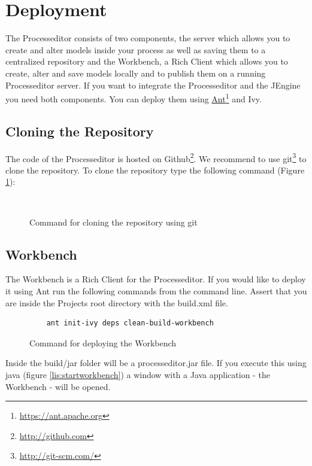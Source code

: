 \section{Deployment}

The Processeditor consists of two components, the server which allows you to create and alter models inside your process as well as saving them to a centralized repository and the Workbench, a Rich Client which allows you to create, alter and save models locally and to publish them on a running Processeditor server.
If you want to integrate the Processeditor and the JEngine you need both components.
You can deploy them using \href{https://ant.apache.org}{Ant}\footnote{\url{https://ant.apache.org}} and Ivy.

\subsection{Cloning the Repository}

The code of the Processeditor is hosted on Github\footnote{\url{http://github.com}}.
We recommend to use git\footnote{\url{http://git-scm.com/}} to clone the repository.
To clone the repository type the following command (Figure \ref{lis:clone}):

\begin{figure}[h!]
\begin{verbatim}
	
\end{verbatim}
\caption{Command for cloning the repository using git}
\label{lis:clone}
\end{figure}

\subsection{Workbench}

The Workbench is a Rich Client for the Processeditor.
If you would like to deploy it using Ant run the following commands from the command line. Assert that you are inside the Projects root directory with the build.xml file.

\begin{figure}[h!]
\begin{verbatim}
	ant init-ivy deps clean-build-workbench
\end{verbatim}
\caption{Command for deploying the Workbench}
\label{lis:depw}
\end{figure}

Inside the build/jar folder will be a processeditor.jar file. If you execute this using java (figure \ref{lis:startworkbench}) a window with a Java application - the Workbench - will be opened.


